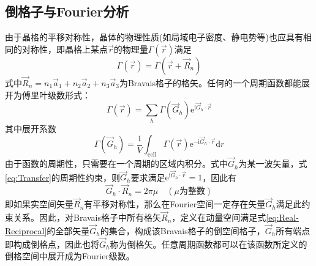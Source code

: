 \subsection{倒格子与Fourier分析}
由于晶格的平移对称性，晶体的物理性质(如局域电子密度、静电势等)也应具有相同的对称性，即晶格上某点$\vec r$的物理量$\Gamma(\vec r)$满足
\begin{equation}
	\Gamma(\vec r)=\Gamma(\vec r+\vec R_n)
	\label{eq:Transfer}
\end{equation} 
式中$\vec R_n=n_1\vec a_1+n_2\vec a_2+n_3\vec a_3$为Bravais格子的格矢。任何的一个周期函数都能展开为傅里叶级数形式：
\begin{equation}
	\Gamma(\vec r)=\sum_h\Gamma(\vec G_h)\mathrm{e}^{\mathrm{i}\vec G_h\cdot\vec r}
	\label{eq:Fourier_Vec-r}
\end{equation} 
其中展开系数
\begin{equation}
	\Gamma(\vec G_h)=\dfrac1V\int_{\mathrm{cell}}\Gamma(\vec r)\mathrm{e}^{-\mathrm{i}\vec G_h\cdot\vec r}\mathrm{d}r
	\label{eq:Fourier_Coeff}
\end{equation}
由于函数的周期性，只需要在一个周期的区域内积分。式中$\vec G_h$为某一波矢量，式\eqref{eq:Transfer}的周期性约束，则$\vec G_h$要求满足$\mathrm{e}^{\mathrm{i}\vec G_h\cdot\vec r}=1$，因此有
\begin{equation}
	\vec G_h\cdot\vec R_n=2\pi\mu\quad(\mu\mbox{为整数})
	\label{eq:Real-Reciprocal}
\end{equation} 
即如果实空间矢量$\vec R_n$有平移对称性，那么在Fourier空间一定存在矢量$\vec G_h$满足此约束关系。因此，对Bravais格子中所有格矢$\vec R_n$，定义在动量空间满足式\eqref{eq:Real-Reciprocal}的全部矢量$\vec G_h$的集合，构成该Bravais格子的倒空间格子，$\vec G_h$所有端点即构成倒格点，因此也将$\vec G_h$称为倒格矢。任意周期函数都可以在该函数所定义的倒格空间中展开成为Fourier级数。 

